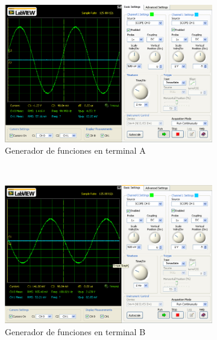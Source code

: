 \documentclass[]{article}
\begin{document}
\begin{figure}[h!]
	
	\centering
	\begin{subfigure}[b]{0.45\textwidth}
		\includegraphics[width=\textwidth]{Imagenes/circuito5generadorVA.png}
		\caption{Generador de funciones en terminal A}
		\label{fig:circuito5generadorVA}
	\end{subfigure}
	~ 
	\begin{subfigure}[b]{0.45\textwidth}
		\includegraphics[width=\textwidth]{Imagenes/circuito5generadorVB.png}
		\caption{Generador de funciones en terminal B}
		\label{fig:circuito5generadorVB}
	\end{subfigure}
	~ 
	\begin{subfigure}[b]{0.45\textwidth}

\end{subfigure}
\end{figure}
\end{document}
